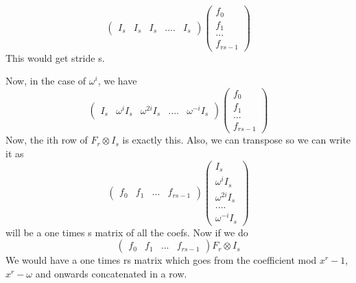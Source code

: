 \documentclass{article}
\begin{document}
	\begin{equation}
		\begin{pmatrix}
			I_s & I_s& I_s & .... & I_s
		\end{pmatrix}
		\begin{pmatrix}
			f_0 \\
			f_1 \\
			... \\
			f_{rs-1}
		\end{pmatrix}
	\end{equation}
	This would get stride s.
	
	Now, in the case of $\omega^i$, we have
	\begin{equation}
		\begin{pmatrix}
			I_s & \omega^i I_s& \omega^{2i}I_s & .... & \omega^{-i}I_s
		\end{pmatrix}
		\begin{pmatrix}
			f_0 \\
			f_1 \\
			... \\
			f_{rs-1}
		\end{pmatrix}
	\end{equation}
	Now, the ith row of $F_r \otimes I_s$ is exactly this. Also, we can transpose so we can write it as
	\begin{equation}
		\begin{pmatrix}
			f_0 & f_1 &	... &f_{rs-1}
		\end{pmatrix}
		\begin{pmatrix}
			I_s \\ \omega^i I_s\\ \omega^{2i}I_s \\ .... \\ \omega^{-i}I_s
		\end{pmatrix}
	\end{equation}
	will be a one times s matrix of all the coefs. Now if we do
	\begin{equation}
		\begin{pmatrix}
			f_0 & f_1 &	... &f_{rs-1}
		\end{pmatrix}
		F_r \otimes I_s
	\end{equation}
	We would have a one times rs matrix which goes from the coefficient mod $x^r-1$, $x^r-\omega$ and onwards concatenated in a row.
	
\end{document}
